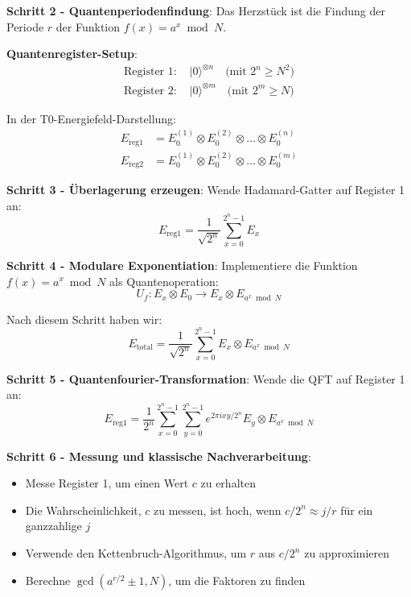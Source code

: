 \documentclass[12pt,a4paper]{article}
\theoremstyle{definition}
\theoremstyle{remark}
\begin{document}
\textbf{Schritt 2 - Quantenperiodenfindung}:
Das Herzst{\"u}ck ist die Findung der Periode $r$ der Funktion $f(x) = a^x \bmod N$.

\textbf{Quantenregister-Setup}:
\begin{align}
	\text{Register 1: } &|0\rangle^{\otimes n} \quad \text{(mit } 2^n \geq N^2\text{)} \\
	\text{Register 2: } &|0\rangle^{\otimes m} \quad \text{(mit } 2^m \geq N\text{)}
\end{align}

In der T0-Energiefeld-Darstellung:
\begin{align}
	E_{\text{reg1}} &= E_0^{(1)} \otimes E_0^{(2)} \otimes \ldots \otimes E_0^{(n)} \\
	E_{\text{reg2}} &= E_0^{(1)} \otimes E_0^{(2)} \otimes \ldots \otimes E_0^{(m)}
\end{align}

\textbf{Schritt 3 - {\"U}berlagerung erzeugen}:
Wende Hadamard-Gatter auf Register 1 an:
\begin{equation}
	E_{\text{reg1}} = \frac{1}{\sqrt{2^n}} \sum_{x=0}^{2^n-1} E_x
\end{equation}

\textbf{Schritt 4 - Modulare Exponentiation}:
Implementiere die Funktion $f(x) = a^x \bmod N$ als Quantenoperation:
\begin{equation}
	U_f: E_x \otimes E_0 \rightarrow E_x \otimes E_{a^x \bmod N}
\end{equation}

Nach diesem Schritt haben wir:
\begin{equation}
	E_{\text{total}} = \frac{1}{\sqrt{2^n}} \sum_{x=0}^{2^n-1} E_x \otimes E_{a^x \bmod N}
\end{equation}

\textbf{Schritt 5 - Quantenfourier-Transformation}:
Wende die QFT auf Register 1 an:
\begin{equation}
	E_{\text{reg1}} = \frac{1}{2^n} \sum_{x=0}^{2^n-1} \sum_{y=0}^{2^n-1} e^{2\pi i xy/2^n} E_y \otimes E_{a^x \bmod N}
\end{equation}

\textbf{Schritt 6 - Messung und klassische Nachverarbeitung}:
\begin{itemize}
	\item Messe Register 1, um einen Wert $c$ zu erhalten
	\item Die Wahrscheinlichkeit, $c$ zu messen, ist hoch, wenn $c/2^n \approx j/r$ f{\"u}r ein ganzzahlige $j$
	\item Verwende den Kettenbruch-Algorithmus, um $r$ aus $c/2^n$ zu approximieren
	\item Berechne $\gcd(a^{r/2} \pm 1, N)$, um die Faktoren zu finden
\end{itemize}
\end{document}
